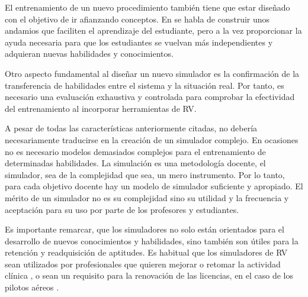 El entrenamiento de un nuevo procedimiento también tiene que estar diseñado con el objetivo de ir afianzando conceptos. En \cite{olson2014jerome} se habla de construir unos andamios que faciliten el aprendizaje del estudiante, pero a la vez proporcionar la ayuda necesaria para que los estudiantes se vuelvan más independientes y adquieran nuevas habilidades y conocimientos.



Otro aspecto fundamental al diseñar un nuevo simulador es la confirmación de la transferencia de habilidades entre el sistema y la situación real. Por tanto, es necesario una evaluación exhaustiva y controlada para comprobar la efectividad del entrenamiento al incorporar herramientas de \ac{RV}\cite{AIM2016224}.

A pesar de todas las características anteriormente citadas, no debería  necesariamente traducirse en la creación de un simulador complejo. En ocasiones no es necesario modelos demasiados complejos para el entrenamiento de determinadas habilidades. La simulación es una metodología docente, el simulador, sea de la complejidad que sea, un mero instrumento. Por lo tanto, para cada objetivo docente hay un modelo de simulador suficiente y apropiado. El mérito de un simulador no es su complejidad sino su utilidad y la frecuencia y aceptación para su uso por parte de los profesores y estudiantes.

Es importante remarcar, que los simuladores no solo están orientados para el desarrollo de nuevos conocimientos y habilidades, sino también son útiles para la retención y readquisición de aptitudes. Es habitual que los simuladores de \ac{RV} sean utilizados por profesionales que quieren mejorar o retomar la actividad clínica \cite{Atesok}, o sean un requisito para la renovación de las licencias, en el caso de los pilotos aéreos \cite{normativa}. 

